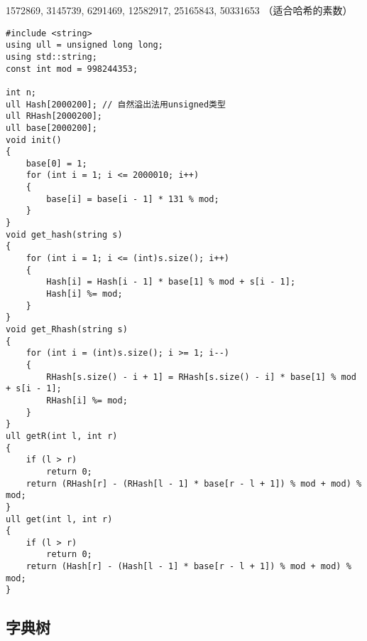 \documentclass[]{article}
\begin{document}
1572869, 3145739, 6291469, 12582917, 25165843, 50331653
（适合哈希的素数）

\begin{verbatim}
#include <string>
using ull = unsigned long long;
using std::string;
const int mod = 998244353;

int n;
ull Hash[2000200]; // 自然溢出法用unsigned类型
ull RHash[2000200];
ull base[2000200];
void init()
{
    base[0] = 1;
    for (int i = 1; i <= 2000010; i++)
    {
        base[i] = base[i - 1] * 131 % mod;
    }
}
void get_hash(string s)
{
    for (int i = 1; i <= (int)s.size(); i++)
    {
        Hash[i] = Hash[i - 1] * base[1] % mod + s[i - 1];
        Hash[i] %= mod;
    }
}
void get_Rhash(string s)
{
    for (int i = (int)s.size(); i >= 1; i--)
    {
        RHash[s.size() - i + 1] = RHash[s.size() - i] * base[1] % mod + s[i - 1];
        RHash[i] %= mod;
    }
}
ull getR(int l, int r)
{
    if (l > r)
        return 0;
    return (RHash[r] - (RHash[l - 1] * base[r - l + 1]) % mod + mod) % mod;
}
ull get(int l, int r)
{
    if (l > r)
        return 0;
    return (Hash[r] - (Hash[l - 1] * base[r - l + 1]) % mod + mod) % mod;
}
\end{verbatim}

\hypertarget{ux5b57ux5178ux6811}{%
\subsection{字典树}\label{ux5b57ux5178ux6811}}
\end{document}
